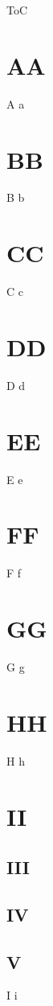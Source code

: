 \documentclass{beamer}
\begin{document}
\begin{frame}[shrink]{ToC}
\tableofcontents
\end{frame}

\section[aa]{AA}
\begin{frame}{A}
a   
\end{frame}

\section[bb]{BB}
\begin{frame}{B}
b
\end{frame}

\section{CC}
\begin{frame}{C}
c
\end{frame}

\section{DD}
\begin{frame}{D}
d
\end{frame}

\section[ee]{EE}
\begin{frame}{E}
e
\end{frame}

\section[ff]{FF}
\begin{frame}{F}
f
\end{frame}

\section[gg]{GG}
\begin{frame}{G}
g
\end{frame}


\section[hh]{HH}
\begin{frame}{H}
h
\end{frame}


\section[ii]{II}
\subsection[iii]{III}
\subsection[iv]{IV}
\subsection[v]{V}
\begin{frame}{I}
i
\end{frame}
\end{document}
